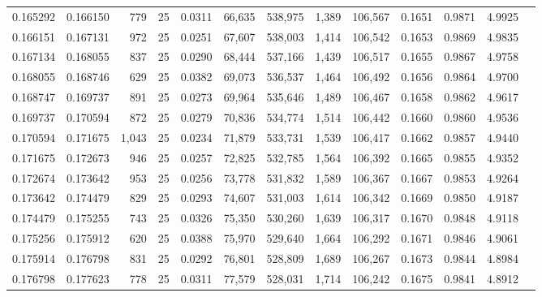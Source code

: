 \begin{tabular}{rrrrrrrrrrrrr}
0.165292 & 0.166150 &   779 &  25 &                                     0.0311 &  66,635 & 538,975 &   1,389 & 106,567 & 0.1651 & 0.9871 & 4.9925 \\
0.166151 & 0.167131 &   972 &  25 &                                     0.0251 &  67,607 & 538,003 &   1,414 & 106,542 & 0.1653 & 0.9869 & 4.9835 \\
0.167134 & 0.168055 &   837 &  25 &                                     0.0290 &  68,444 & 537,166 &   1,439 & 106,517 & 0.1655 & 0.9867 & 4.9758 \\
0.168055 & 0.168746 &   629 &  25 &                                     0.0382 &  69,073 & 536,537 &   1,464 & 106,492 & 0.1656 & 0.9864 & 4.9700 \\
0.168747 & 0.169737 &   891 &  25 &                                     0.0273 &  69,964 & 535,646 &   1,489 & 106,467 & 0.1658 & 0.9862 & 4.9617 \\
0.169737 & 0.170594 &   872 &  25 &                                     0.0279 &  70,836 & 534,774 &   1,514 & 106,442 & 0.1660 & 0.9860 & 4.9536 \\
0.170594 & 0.171675 & 1,043 &  25 &                                     0.0234 &  71,879 & 533,731 &   1,539 & 106,417 & 0.1662 & 0.9857 & 4.9440 \\
0.171675 & 0.172673 &   946 &  25 &                                     0.0257 &  72,825 & 532,785 &   1,564 & 106,392 & 0.1665 & 0.9855 & 4.9352 \\
0.172674 & 0.173642 &   953 &  25 &                                     0.0256 &  73,778 & 531,832 &   1,589 & 106,367 & 0.1667 & 0.9853 & 4.9264 \\
0.173642 & 0.174479 &   829 &  25 &                                     0.0293 &  74,607 & 531,003 &   1,614 & 106,342 & 0.1669 & 0.9850 & 4.9187 \\
0.174479 & 0.175255 &   743 &  25 &                                     0.0326 &  75,350 & 530,260 &   1,639 & 106,317 & 0.1670 & 0.9848 & 4.9118 \\
0.175256 & 0.175912 &   620 &  25 &                                     0.0388 &  75,970 & 529,640 &   1,664 & 106,292 & 0.1671 & 0.9846 & 4.9061 \\
0.175914 & 0.176798 &   831 &  25 &                                     0.0292 &  76,801 & 528,809 &   1,689 & 106,267 & 0.1673 & 0.9844 & 4.8984 \\
0.176798 & 0.177623 &   778 &  25 &                                     0.0311 &  77,579 & 528,031 &   1,714 & 106,242 & 0.1675 & 0.9841 & 4.8912 \\

\end{tabular}
